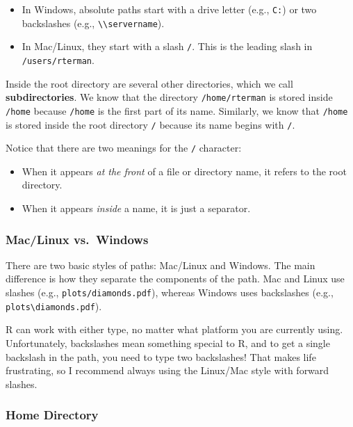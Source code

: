 \documentclass[
]{book}
\providecommand{\tightlist}{%
  \setlength{\itemsep}{0pt}\setlength{\parskip}{0pt}}
\begin{document}
\begin{itemize}
\tightlist
\item
  In Windows, absolute paths start with a drive letter (e.g., \texttt{C:}) or two backslashes (e.g., \texttt{\textbackslash{}\textbackslash{}servername}).
\item
  In Mac/Linux, they start with a slash \texttt{/}. This is the leading slash in \texttt{/users/rterman}.
\end{itemize}

Inside the root directory are several other directories, which we call \textbf{subdirectories}. We know that the directory \texttt{/home/rterman} is stored inside \texttt{/home} because \texttt{/home} is the first part of its name. Similarly, we know that \texttt{/home} is stored inside the root directory \texttt{/} because its name begins with \texttt{/}.

Notice that there are two meanings for the \texttt{/} character:

\begin{itemize}
\tightlist
\item
  When it appears \emph{at the front} of a file or directory name, it refers to the root directory.
\item
  When it appears \emph{inside} a name, it is just a separator.
\end{itemize}

\hypertarget{maclinux-vs.-windows}{%
\subsubsection*{Mac/Linux vs.~Windows}\label{maclinux-vs.-windows}}

There are two basic styles of paths: Mac/Linux and Windows. The main difference is how they separate the components of the path. Mac and Linux use slashes (e.g., \texttt{plots/diamonds.pdf}), whereas Windows uses backslashes (e.g., \texttt{plots\textbackslash{}diamonds.pdf}).

R can work with either type, no matter what platform you are currently using. Unfortunately, backslashes mean something special to R, and to get a single backslash in the path, you need to type two backslashes! That makes life frustrating, so I recommend always using the Linux/Mac style with forward slashes.

\hypertarget{home-directory}{%
\subsubsection*{Home Directory}\label{home-directory}}
\end{document}
